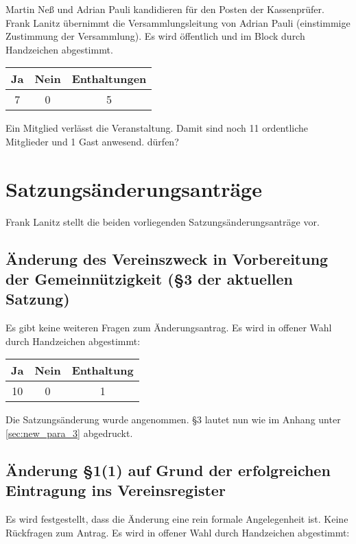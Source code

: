 \documentclass{scrartcl}
\begin{document}
Martin Neß und Adrian Pauli kandidieren für den Posten der 
Kassenprüfer. Frank Lanitz übernimmt die Versammlungsleitung von 
Adrian Pauli (einstimmige Zustimmung der Versammlung). Es wird 
öffentlich und im Block durch Handzeichen abgestimmt.

\begin{table}[h!]
    \centering
    \begin{tabular}{c|c|c}
        \textbf{Ja}& \textbf{Nein} & \textbf{Enthaltungen} \\ \hline
        7 & 0 & 5
    \end{tabular}
\end{table}

Ein Mitglied verlässt die Veranstaltung. Damit sind noch 11 ordentliche
Mitglieder und 1 Gast anwesend.
dürfen?

\section{Satzungsänderungsanträge}
Frank Lanitz stellt die beiden vorliegenden Satzungsänderungsanträge
vor.

\subsection{Änderung des Vereinszweck in Vorbereitung der
Gemeinnützigkeit (§3 der aktuellen Satzung)}

Es gibt keine weiteren Fragen zum Änderungsantrag. Es wird in offener
Wahl durch Handzeichen abgestimmt:

\begin{table}[h!]
    \centering
    \begin{tabular}{c|c|c}
        \textbf{Ja} & \textbf{Nein} & \textbf{Enthaltung} \\ \hline
        10 & 0 & 1
    \end{tabular}
\end{table}

Die Satzungsänderung wurde angenommen. §3 lautet nun wie im Anhang unter
\ref{sec:new_para_3} abgedruckt.

\subsection{Änderung §1(1) auf Grund der erfolgreichen Eintragung ins
Vereinsregister}

Es wird festgestellt, dass die Änderung eine rein formale Angelegenheit
ist. Keine Rückfragen zum Antrag. Es wird in offener Wahl durch
Handzeichen abgestimmt:
\end{document}
